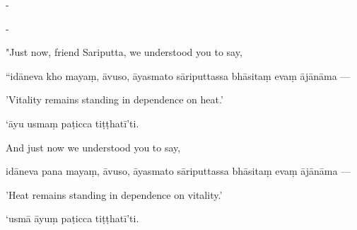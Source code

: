 \begin{samepage}
\begin{leftcolumn*}
-
\end{leftcolumn*}

\begin{rightcolumn}
-
\end{rightcolumn}
\end{samepage}

\begin{samepage}
\begin{leftcolumn*}
"Just now, friend Sariputta, we understood you to say,
\end{leftcolumn*}

\begin{rightcolumn}
“idāneva kho mayaṃ, āvuso, āyasmato sāriputtassa bhāsitaṃ evaṃ ājānāma —
\end{rightcolumn}
\end{samepage}

\begin{samepage}
\begin{leftcolumn*}
'Vitality remains standing in dependence on heat.'
\end{leftcolumn*}

\begin{rightcolumn}
‘āyu usmaṃ paṭicca tiṭṭhatī’ti.
\end{rightcolumn}
\end{samepage}

\begin{samepage}
\begin{leftcolumn*}
And just now we understood you to say,
\end{leftcolumn*}

\begin{rightcolumn}
idāneva pana mayaṃ, āvuso, āyasmato sāriputtassa bhāsitaṃ evaṃ ājānāma —
\end{rightcolumn}
\end{samepage}

\begin{samepage}
\begin{leftcolumn*}
'Heat remains standing in dependence on vitality.'
\end{leftcolumn*}

\begin{rightcolumn}
‘usmā āyuṃ paṭicca tiṭṭhatī’ti.
\end{rightcolumn}
\end{samepage}

